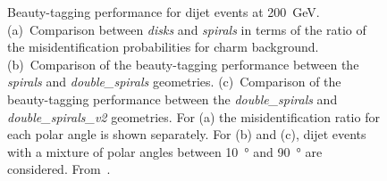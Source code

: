\begin{figure}[htbp]
\begin{subfigure}[b]{0.33\textwidth}
    \caption{}
    \label{fig:doubleSpirals_doubleSpirals}
  \end{subfigure}
  \caption{Beauty-tagging performance for dijet events at
    \SI{200}{\giga\electronvolt}. (a)~Comparison between \emph{disks}
    and \emph{spirals} in terms of the ratio of the misidentification
    probabilities for charm background. (b)~Comparison of the
    beauty-tagging performance between the \emph{spirals} and
    \emph{double\_spirals} geometries. (c)~Comparison of the
    beauty-tagging performance between the \emph{double\_spirals} and
    \emph{double\_spirals\_v2} geometries. For (a) the
    misidentification ratio for each polar angle is shown
    separately. For (b) and (c), dijet events with a mixture of polar
    angles between \SI{10}{\degree} and \SI{90}{\degree} are
    considered. From~\cite{Tehrani:2015tla}.}
  \label{fig:performance}
\end{figure}

